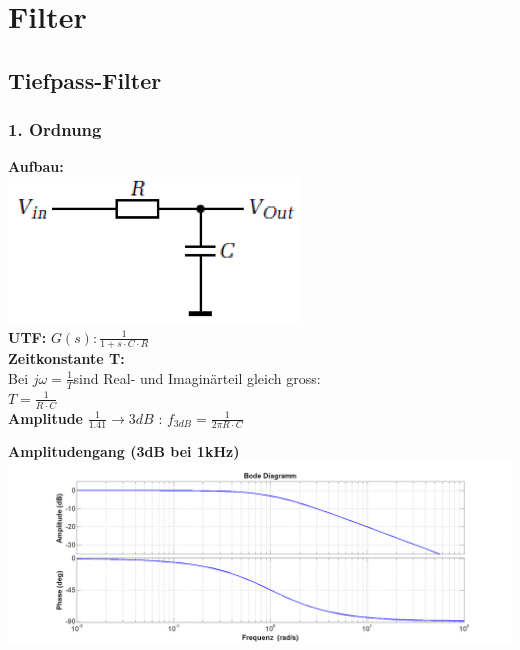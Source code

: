 \section{Filter}
\subsection{Tiefpass-Filter}

\subsubsection{1. Ordnung}
\begin{multicols}{2}
	\textbf{Aufbau:} \\
	\includegraphics[scale=0.4]{pictures/tiefpass1ordnung} \\
	\textbf{UTF: } $G(s): \frac{1}{1+s\cdot C\cdot R}$ \\
	\textbf{Zeitkonstante T:} \\
	Bei $j\omega=\frac{1}{T}$sind Real-  und Imaginärteil gleich gross:  \\
	$T=\frac{1}{R \cdot C}$ \\
	\textbf{Amplitude} $\frac{1}{1.41}\to 3dB$ : $f_{3dB}=\frac{1}{2\pi R\cdot C}$ \\	
\end{multicols}

\textbf{Amplitudengang (3dB bei 1kHz)}\\
\includegraphics[scale=0.5]{./pictures/TP1BodePlot.png}



